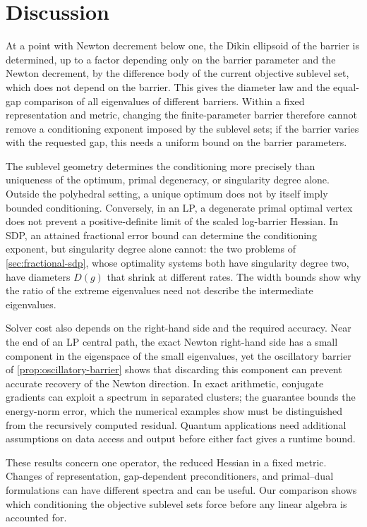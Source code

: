 \section{Discussion}
\label{sec:discussion}

At a point with Newton decrement below one, the Dikin ellipsoid of the
barrier is determined, up to a factor depending only on the barrier
parameter and the Newton decrement, by the difference body of the
current objective sublevel set, which does not depend on the barrier.
This gives the diameter law and the equal-gap comparison of all
eigenvalues of different barriers. Within a fixed representation and
metric, changing the finite-parameter barrier therefore cannot
remove a conditioning exponent imposed by the sublevel sets; if
the barrier varies with the requested gap, this needs a uniform bound on
the barrier parameters.

The sublevel geometry determines the conditioning more precisely than
uniqueness of the optimum, primal degeneracy, or singularity degree
alone. Outside the polyhedral
setting, a unique optimum does not by itself imply bounded
conditioning. Conversely, in an LP, a degenerate primal optimal vertex
does not prevent a positive-definite limit of the scaled log-barrier
Hessian. In SDP, an attained fractional error bound can determine the
conditioning exponent, but singularity degree alone cannot: the two
problems of \cref{sec:fractional-sdp}, whose optimality systems both
have singularity degree two, have diameters $D(g)$ that shrink at
different rates. The width bounds show
why the ratio of the extreme eigenvalues need not describe the
intermediate eigenvalues.

Solver cost also depends on the right-hand side and the
required accuracy. Near the end of an LP central path, the exact Newton
right-hand side has a small component in the eigenspace of the small
eigenvalues, yet the oscillatory barrier of
\cref{prop:oscillatory-barrier} shows that discarding this component
can prevent accurate recovery of the Newton direction. In exact
arithmetic, conjugate gradients can exploit a spectrum in separated
clusters; the guarantee bounds the energy-norm error, which the
numerical examples show must be distinguished from the recursively
computed residual. Quantum applications need additional assumptions on
data access and output before either fact gives a runtime bound.

These results concern one operator, the reduced Hessian in a fixed
metric. Changes of representation,
gap-dependent preconditioners, and primal--dual formulations can have
different spectra and can be useful. Our comparison shows which
conditioning the objective sublevel sets force before any linear
algebra is accounted for.
